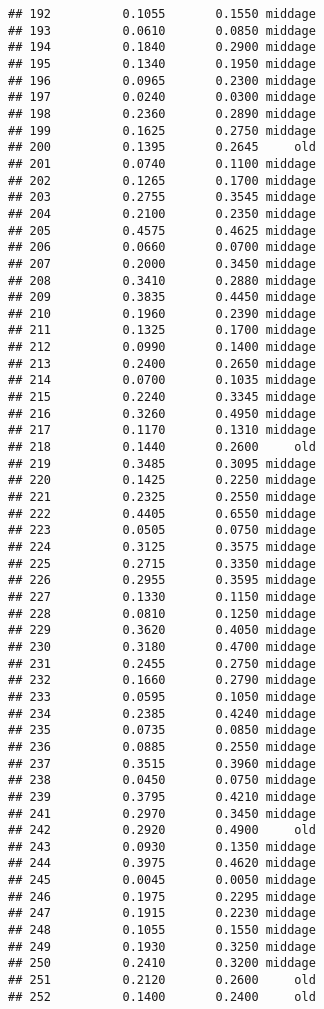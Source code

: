 \documentclass[
]{article}
\begin{document}
\begin{verbatim}
## 192          0.1055       0.1550 middage
## 193          0.0610       0.0850 middage
## 194          0.1840       0.2900 middage
## 195          0.1340       0.1950 middage
## 196          0.0965       0.2300 middage
## 197          0.0240       0.0300 middage
## 198          0.2360       0.2890 middage
## 199          0.1625       0.2750 middage
## 200          0.1395       0.2645     old
## 201          0.0740       0.1100 middage
## 202          0.1265       0.1700 middage
## 203          0.2755       0.3545 middage
## 204          0.2100       0.2350 middage
## 205          0.4575       0.4625 middage
## 206          0.0660       0.0700 middage
## 207          0.2000       0.3450 middage
## 208          0.3410       0.2880 middage
## 209          0.3835       0.4450 middage
## 210          0.1960       0.2390 middage
## 211          0.1325       0.1700 middage
## 212          0.0990       0.1400 middage
## 213          0.2400       0.2650 middage
## 214          0.0700       0.1035 middage
## 215          0.2240       0.3345 middage
## 216          0.3260       0.4950 middage
## 217          0.1170       0.1310 middage
## 218          0.1440       0.2600     old
## 219          0.3485       0.3095 middage
## 220          0.1425       0.2250 middage
## 221          0.2325       0.2550 middage
## 222          0.4405       0.6550 middage
## 223          0.0505       0.0750 middage
## 224          0.3125       0.3575 middage
## 225          0.2715       0.3350 middage
## 226          0.2955       0.3595 middage
## 227          0.1330       0.1150 middage
## 228          0.0810       0.1250 middage
## 229          0.3620       0.4050 middage
## 230          0.3180       0.4700 middage
## 231          0.2455       0.2750 middage
## 232          0.1660       0.2790 middage
## 233          0.0595       0.1050 middage
## 234          0.2385       0.4240 middage
## 235          0.0735       0.0850 middage
## 236          0.0885       0.2550 middage
## 237          0.3515       0.3960 middage
## 238          0.0450       0.0750 middage
## 239          0.3795       0.4210 middage
## 241          0.2970       0.3450 middage
## 242          0.2920       0.4900     old
## 243          0.0930       0.1350 middage
## 244          0.3975       0.4620 middage
## 245          0.0045       0.0050 middage
## 246          0.1975       0.2295 middage
## 247          0.1915       0.2230 middage
## 248          0.1055       0.1550 middage
## 249          0.1930       0.3250 middage
## 250          0.2410       0.3200 middage
## 251          0.2120       0.2600     old
## 252          0.1400       0.2400     old

\end{verbatim}
\end{document}
